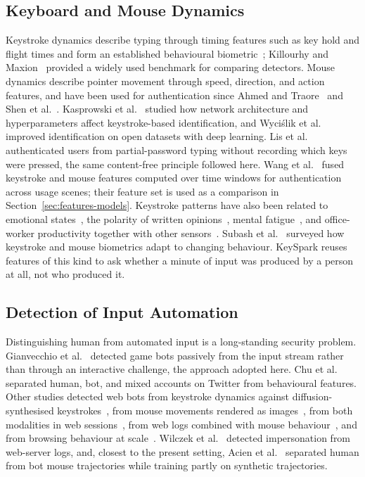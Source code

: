 \documentclass[sensors,article,submit,pdftex,oneauthor]{Definitions/mdpi}
\begin{document}
\subsection{Keyboard and Mouse Dynamics}
Keystroke dynamics describe typing through timing features such as key hold and flight times and form an established behavioural biometric~\cite{monrose2000keystroke, teh2013survey}; Killourhy and Maxion~\cite{killourhy2009comparing} provided a widely used benchmark for comparing detectors. Mouse dynamics describe pointer movement through speed, direction, and action features, and have been used for authentication since Ahmed and Traore~\cite{ahmed2007mouse} and Shen et al.~\cite{shen2013mouse}. Kasprowski et al.~\cite{kasprowski2022keystroke} studied how network architecture and hyperparameters affect keystroke-based identification, and Wyci\'slik et al.~\cite{wycislik2024keystroke} improved identification on open datasets with deep learning. Lis et al.~\cite{lis2023siamese} authenticated users from partial-password typing without recording which keys were pressed, the same content-free principle followed here. Wang et al.~\cite{wang2022siurua} fused keystroke and mouse features computed over time windows for authentication across usage scenes; their feature set is used as a comparison in Section~\ref{sec:features-models}. Keystroke patterns have also been related to emotional states~\cite{epp2011identifying}, the polarity of written opinions~\cite{kolakowska2021opinions}, mental fatigue~\cite{acien2022fatigue}, and office-worker productivity together with other sensors~\cite{awada2023productivity}. Subash et al.~\cite{subash2026adaptability} surveyed how keystroke and mouse biometrics adapt to changing behaviour. KeySpark reuses features of this kind to ask whether a minute of input was produced by a person at all, not who produced it.

\subsection{Detection of Input Automation}
Distinguishing human from automated input is a long-standing security problem. Gianvecchio et al.~\cite{gianvecchio2009botcraft} detected game bots passively from the input stream rather than through an interactive challenge, the approach adopted here. Chu et al.~\cite{chu2012cyborg} separated human, bot, and mixed accounts on Twitter from behavioural features. Other studies detected web bots from keystroke dynamics against diffusion-synthesised keystrokes~\cite{see2024webbots}, from mouse movements rendered as images~\cite{niu2023visual, niu2024lightweight}, from both modalities in web sessions~\cite{modi2026comparison}, from web logs combined with mouse behaviour~\cite{iliou2021webbots}, and from browsing behaviour at scale~\cite{kadel2024botracle}. Wilczek et al.~\cite{wilczek2026intruder} detected impersonation from web-server logs, and, closest to the present setting, Acien et al.~\cite{acien2022becaptcha} separated human from bot mouse trajectories while training partly on synthetic trajectories.
\end{document}
